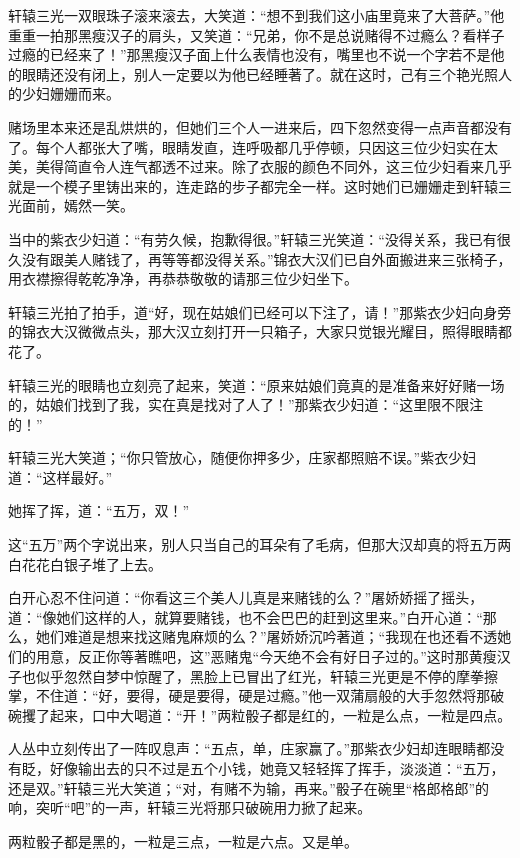 \documentclass[12pt,oneside]{book}
\begin{document}
轩辕三光一双眼珠子滚来滚去，大笑道：``想不到我们这小庙里竟来了大菩萨。''他重重一拍那黑瘦汉子的肩头，又笑道：``兄弟，你不是总说赌得不过瘾么？看样子过瘾的已经来了！''那黑瘦汉子面上什么表情也没有，嘴里也不说一个字若不是他的眼睛还没有闭上，别人一定要以为他已经睡著了。就在这时，己有三个艳光照人的少妇姗姗而来。

赌场里本来还是乱烘烘的，但她们三个人一进来后，四下忽然变得一点声音都没有了。每个人都张大了嘴，眼睛发直，连呼吸都几乎停顿，只因这三位少妇实在太美，美得简直令人连气都透不过来。除了衣服的颜色不同外，这三位少妇看来几乎就是一个模子里铸出来的，连走路的步子都完全一样。这时她们已姗姗走到轩辕三光面前，嫣然一笑。

当中的紫衣少妇道：``有劳久候，抱歉得很。''轩辕三光笑道：``没得关系，我已有很久没有跟美人赌钱了，再等等都没得关系。''锦衣大汉们已自外面搬进来三张椅子，用衣襟擦得乾乾净净，再恭恭敬敬的请那三位少妇坐下。

轩辕三光拍了拍手，道``好，现在姑娘们已经可以下注了，请！''那紫衣少妇向身旁的锦衣大汉微微点头，那大汉立刻打开一只箱子，大家只觉银光耀目，照得眼睛都花了。

轩辕三光的眼睛也立刻亮了起来，笑道：``原来姑娘们竟真的是准备来好好赌一场的，姑娘们找到了我，实在真是找对了人了！''那紫衣少妇道：``这里限不限注的！''

轩辕三光大笑道；``你只管放心，随便你押多少，庄家都照赔不误。''紫衣少妇道：``这样最好。''

她挥了挥，道：``五万，双！''

这``五万''两个字说出来，别人只当自己的耳朵有了毛病，但那大汉却真的将五万两白花花白银子堆了上去。

白开心忍不住问道：``你看这三个美人儿真是来赌钱的么？''屠娇娇摇了摇头，道：``像她们这样的人，就算要赌钱，也不会巴巴的赶到这里来。''白开心道：``那么，她们难道是想来找这赌鬼麻烦的么？''屠娇娇沉吟著道；``我现在也还看不透她们的用意，反正你等著瞧吧，这''恶赌鬼``今天绝不会有好日子过的。''这时那黄瘦汉子也似乎忽然自梦中惊醒了，黑脸上已冒出了红光，轩辕三光更是不停的摩拳擦掌，不住道：``好，要得，硬是要得，硬是过瘾。''他一双蒲扇般的大手忽然将那破碗攫了起来，口中大喝道：``开！''两粒骰子都是红的，一粒是么点，一粒是四点。

人丛中立刻传出了一阵叹息声：``五点，单，庄家赢了。''那紫衣少妇却连眼睛都没有眨，好像输出去的只不过是五个小钱，她竟又轻轻挥了挥手，淡淡道：``五万，还是双。''轩辕三光大笑道；``对，有赌不为输，再来。''骰子在碗里``格郎格郎''的响，突听``吧''的一声，轩辕三光将那只破碗用力掀了起来。

两粒骰子都是黑的，一粒是三点，一粒是六点。又是单。
\end{document}

